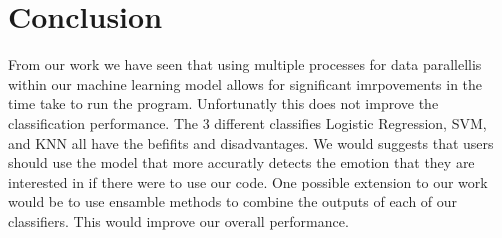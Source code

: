 \section{Conclusion}
\label{sec:conclusion}
From our work we have seen that using multiple processes
for data parallellis within our machine learning model allows for significant imrpovements in the time take to run the program.
Unfortunatly this does not improve the classification performance.
The 3 different classifies Logistic Regression,
SVM, and KNN
all have the befifits and disadvantages.
We would suggests that users should use the model that more accuratly detects
the emotion that they are interested in if there were to use our code.
One possible extension to our work would be to use ensamble methods to
combine the outputs of each of our classifiers.
This would improve our overall performance.

